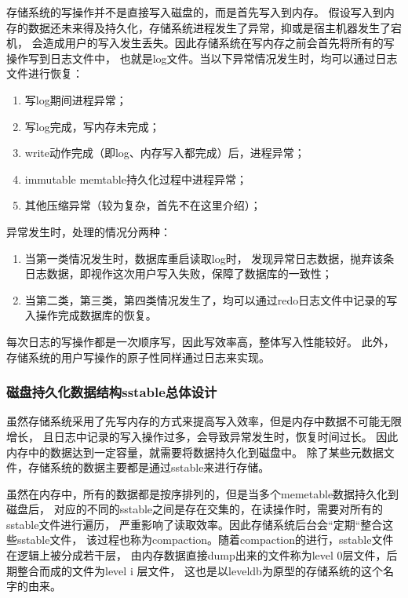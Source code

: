 		存储系统的写操作并不是直接写入磁盘的，而是首先写入到内存。
		假设写入到内存的数据还未来得及持久化，存储系统进程发生了异常，抑或是宿主机器发生了宕机，
		会造成用户的写入发生丢失。因此存储系统在写内存之前会首先将所有的写操作写到日志文件中，
		也就是log文件。当以下异常情况发生时，均可以通过日志文件进行恢复：

		\begin{enumerate}
			\item 写log期间进程异常；
			\item 写log完成，写内存未完成；
			\item write动作完成（即log、内存写入都完成）后，进程异常；
			\item immutable memtable持久化过程中进程异常；
			\item 其他压缩异常（较为复杂，首先不在这里介绍）；
		\end{enumerate}
	
	异常发生时，处理的情况分两种：
		\begin{enumerate}
			\item 当第一类情况发生时，数据库重启读取log时，
			发现异常日志数据，抛弃该条日志数据，即视作这次用户写入失败，保障了数据库的一致性；
			\item 当第二类，第三类，第四类情况发生了，均可以通过redo日志文件中记录的写入操作完成数据库的恢复。
		\end{enumerate}
		每次日志的写操作都是一次顺序写，因此写效率高，整体写入性能较好。
		此外，存储系统的用户写操作的原子性同样通过日志来实现。

		\subsubsection{磁盘持久化数据结构sstable总体设计}

		虽然存储系统采用了先写内存的方式来提高写入效率，但是内存中数据不可能无限增长，
		且日志中记录的写入操作过多，会导致异常发生时，恢复时间过长。
		因此内存中的数据达到一定容量，就需要将数据持久化到磁盘中。
		除了某些元数据文件，存储系统的数据主要都是通过sstable来进行存储。

		虽然在内存中，所有的数据都是按序排列的，但是当多个memetable数据持久化到磁盘后，
		对应的不同的sstable之间是存在交集的，在读操作时，需要对所有的sstable文件进行遍历，
		严重影响了读取效率。因此存储系统后台会“定期“整合这些sstable文件，
		该过程也称为compaction。随着compaction的进行，sstable文件在逻辑上被分成若干层，
		由内存数据直接dump出来的文件称为level 0层文件，后期整合而成的文件为level i 层文件，
		这也是以leveldb为原型的存储系统的这个名字的由来。

